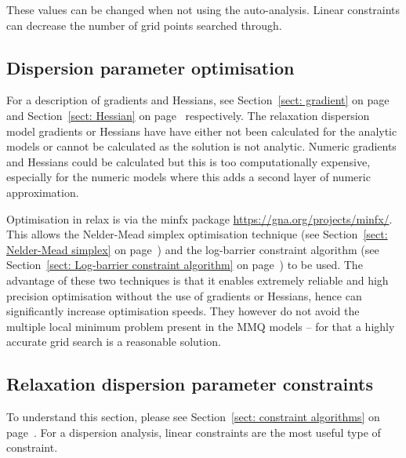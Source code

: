 These values can be changed when not using the auto-analysis.
Linear constraints can decrease the number of grid points searched through.




\subsection{Dispersion parameter optimisation}

For a description of gradients and Hessians, see Section~\ref{sect: gradient} on page~\pageref{sect: gradient} and Section~\ref{sect: Hessian} on page~\pageref{sect: Hessian} respectively.
The relaxation dispersion model gradients or Hessians have have either not been calculated for the analytic models or cannot be calculated as the solution is not analytic.
Numeric gradients and Hessians could be calculated but this is too computationally expensive, especially for the numeric models where this adds a second layer of numeric approximation.

Optimisation in relax is via the minfx package \url{https://gna.org/projects/minfx/}.
This allows the Nelder-Mead simplex optimisation technique (see Section~\ref{sect: Nelder-Mead simplex} on page~\pageref{sect: Nelder-Mead simplex}) and the log-barrier constraint algorithm (see Section~\ref{sect: Log-barrier constraint algorithm} on page~\pageref{sect: Log-barrier constraint algorithm}) to be used.
The advantage of these two techniques is that it enables extremely reliable and high precision optimisation without the use of gradients or Hessians, hence can significantly increase optimisation speeds.
They however do not avoid the multiple local minimum problem present in the MMQ models -- for that a highly accurate grid search is a reasonable solution.



\subsection{Relaxation dispersion parameter constraints}

To understand this section, please see Section~\ref{sect: constraint algorithms} on page~\pageref{sect: constraint algorithms}.
For a dispersion analysis, linear constraints are the most useful type of constraint.

